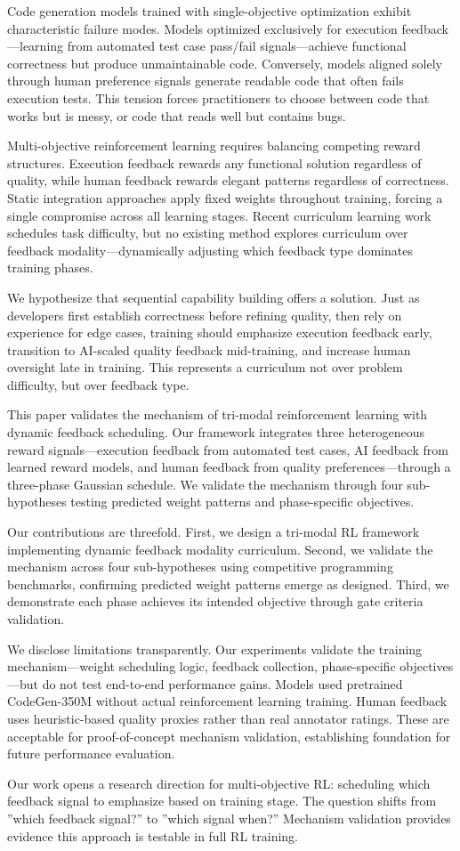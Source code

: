 
Code generation models trained with single-objective optimization exhibit characteristic failure modes. Models optimized exclusively for execution feedback---learning from automated test case pass/fail signals---achieve functional correctness but produce unmaintainable code. Conversely, models aligned solely through human preference signals generate readable code that often fails execution tests. This tension forces practitioners to choose between code that works but is messy, or code that reads well but contains bugs.

Multi-objective reinforcement learning requires balancing competing reward structures. Execution feedback rewards any functional solution regardless of quality, while human feedback rewards elegant patterns regardless of correctness. Static integration approaches apply fixed weights throughout training, forcing a single compromise across all learning stages. Recent curriculum learning work schedules task difficulty, but no existing method explores curriculum over feedback modality---dynamically adjusting which feedback type dominates training phases.

We hypothesize that sequential capability building offers a solution. Just as developers first establish correctness before refining quality, then rely on experience for edge cases, training should emphasize execution feedback early, transition to AI-scaled quality feedback mid-training, and increase human oversight late in training. This represents a curriculum not over problem difficulty, but over feedback type.

This paper validates the mechanism of tri-modal reinforcement learning with dynamic feedback scheduling. Our framework integrates three heterogeneous reward signals---execution feedback from automated test cases, AI feedback from learned reward models, and human feedback from quality preferences---through a three-phase Gaussian schedule. We validate the mechanism through four sub-hypotheses testing predicted weight patterns and phase-specific objectives.

Our contributions are threefold. First, we design a tri-modal RL framework implementing dynamic feedback modality curriculum. Second, we validate the mechanism across four sub-hypotheses using competitive programming benchmarks, confirming predicted weight patterns emerge as designed. Third, we demonstrate each phase achieves its intended objective through gate criteria validation.

We disclose limitations transparently. Our experiments validate the training mechanism---weight scheduling logic, feedback collection, phase-specific objectives---but do not test end-to-end performance gains. Models used pretrained CodeGen-350M without actual reinforcement learning training. Human feedback uses heuristic-based quality proxies rather than real annotator ratings. These are acceptable for proof-of-concept mechanism validation, establishing foundation for future performance evaluation.

Our work opens a research direction for multi-objective RL: scheduling which feedback signal to emphasize based on training stage. The question shifts from ''which feedback signal?'' to ''which signal when?'' Mechanism validation provides evidence this approach is testable in full RL training.
